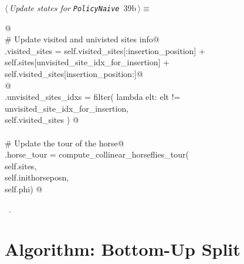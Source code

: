 \documentclass[11.5pt]{report}
\begin{document}
\newchunk 
\begin{flushleft} \small\label{scrap38}\raggedright\small
{} $\langle\,${\itshape Update states for \texttt{PolicyNaive}}\nobreak\ {\footnotesize {39b}}$\,\rangle\equiv$
\vspace{-1ex}
\begin{list}{}{} \item
\mbox{}\verb@   @\\
\mbox{}\verb@# Update visited and univisted sites info@\\
\mbox{}\verb@self.visited_sites = self.visited_sites[:insertion_position]      +\@\\
\mbox{}\verb@                     self.sites[unvisited_site_idx_for_insertion] +\@\\
\mbox{}\verb@                     self.visited_sites[insertion_position:]@\\
\mbox{}\verb@  @\\
\mbox{}\verb@self.unvisited_sites_idxs = filter( lambda elt: elt != unvisited_site_idx_for_insertion, \@\\
\mbox{}\verb@                                    self.visited_sites ) @\\
\mbox{}\verb@@\\
\mbox{}\verb@# Update the tour of the horse@\\
\mbox{}\verb@self.horse_tour = compute_collinear_horseflies_tour(\@\\
\mbox{}\verb@                           self.sites,         \@\\
\mbox{}\verb@                           self.inithorseposn, \@\\
\mbox{}\verb@                           self.phi) @\\
\mbox{}\verb@@{\NWsep}
\end{list}
\vspace{-1.5ex}
\footnotesize
\begin{list}{}{\setlength{\itemsep}{-\parsep}\setlength{\itemindent}{-\leftmargin}}
\item \NWtxtMacroRefIn\ .

\item{}
\end{list}
\vspace{4ex}
\end{flushleft}
\section{Algorithm: Bottom-Up Split}  
\end{document}

